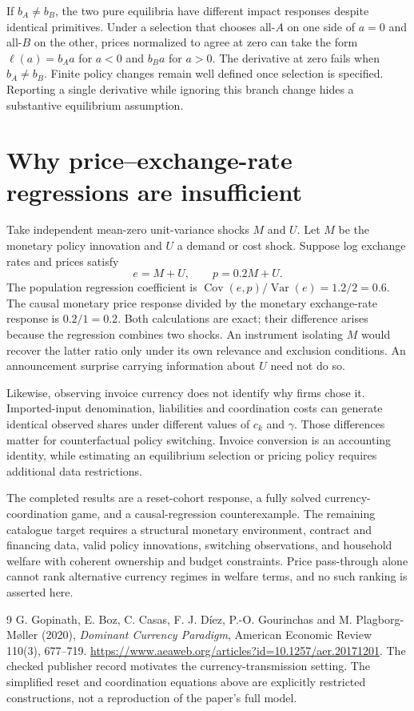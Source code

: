 \documentclass[11pt,a4paper]{article}
\DeclareMathOperator{\Var}{Var}
\DeclareMathOperator{\Cov}{Cov}
\begin{document}
If $b_A\ne b_B$, the two pure equilibria have different impact responses despite identical primitives. Under a selection that chooses all-$A$ on one side of $a=0$ and all-$B$ on the other, prices normalized to agree at zero can take the form $\ell(a)=b_Aa$ for $a<0$ and $b_Ba$ for $a>0$. The derivative at zero fails when $b_A\ne b_B$. Finite policy changes remain well defined once selection is specified. Reporting a single derivative while ignoring this branch change hides a substantive equilibrium assumption.

\section{Why price--exchange-rate regressions are insufficient}
Take independent mean-zero unit-variance shocks $M$ and $U$. Let $M$ be the monetary policy innovation and $U$ a demand or cost shock. Suppose log exchange rates and prices satisfy
\[
 e=M+U,\qquad p=0.2M+U.
\]
The population regression coefficient is $\Cov(e,p)/\Var(e)=1.2/2=0.6$. The causal monetary price response divided by the monetary exchange-rate response is $0.2/1=0.2$. Both calculations are exact; their difference arises because the regression combines two shocks. An instrument isolating $M$ would recover the latter ratio only under its own relevance and exclusion conditions. An announcement surprise carrying information about $U$ need not do so.

Likewise, observing invoice currency does not identify why firms chose it. Imported-input denomination, liabilities and coordination costs can generate identical observed shares under different values of $c_k$ and $\gamma$. Those differences matter for counterfactual policy switching. Invoice conversion is an accounting identity, while estimating an equilibrium selection or pricing policy requires additional data restrictions.

The completed results are a reset-cohort response, a fully solved currency-coordination game, and a causal-regression counterexample. The remaining catalogue target requires a structural monetary environment, contract and financing data, valid policy innovations, switching observations, and household welfare with coherent ownership and budget constraints. Price pass-through alone cannot rank alternative currency regimes in welfare terms, and no such ranking is asserted here.

\begin{thebibliography}{9}
 G. Gopinath, E. Boz, C. Casas, F. J. D\'iez, P.-O. Gourinchas and M. Plagborg-M\o ller (2020), \emph{Dominant Currency Paradigm}, American Economic Review 110(3), 677--719. \url{https://www.aeaweb.org/articles?id=10.1257/aer.20171201}. The checked publisher record motivates the currency-transmission setting. The simplified reset and coordination equations above are explicitly restricted constructions, not a reproduction of the paper's full model.
\end{thebibliography}
\end{document}
